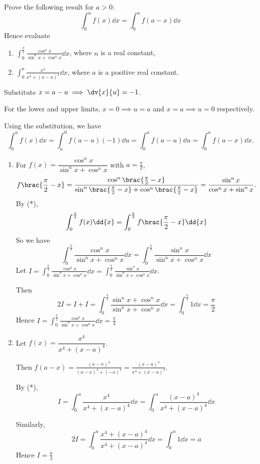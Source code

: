 \begin{exercise}{}{}
Prove the following result for $a>0$:
\begin{equation*}\tag{*}
\int_0^af(x)\dd{x}=\int_0^af(a-x)\dd{x}
\end{equation*}
Hence evaluate
\begin{enumerate}[label=(\alph*)]
\item $\displaystyle\int_0^\frac{\pi}{2}\frac{\cos^nx}{\sin^nx+\cos^nx}\dd{x}$, where $n$ is a real constant,
\item $\displaystyle\int_0^a\frac{x^4}{x^4+(x-a)^4}\dd{x}$, where $a$ is a positive real constant.
\end{enumerate}
\end{exercise}
\begin{solution}
Substitute $x=a-u\implies\dv{x}{u}=-1$.

For the lower and upper limits, $x=0\implies u=a$ and $x=a\implies u=0$ respectively.

Using the substitution, we have
\[ \int_0^af(x)\dd{x}=\int_a^0f(a-u)(-1)\dd{u}=\int_0^af(a-u)\dd{u}=\int_0^af(a-x)\dd{x}. \]

\begin{enumerate}[label=(\alph*)]
\item For $f(x)=\dfrac{\cos^nx}{\sin^nx+\cos^nx}$ with $a=\frac{\pi}{2}$,
\[ f\brac{\frac{\pi}{2}-x}=\frac{\cos^n\brac{\frac{\pi}{2}-x}}{\sin^n\brac{\frac{\pi}{2}-x}+\cos^n\brac{\frac{\pi}{2}-x}}=\frac{\sin^nx}{\cos^nx+\sin^nx}. \]
By (*), 
\[ \int_0^\frac{\pi}{2}f(x)\dd{x}=\int_0^\frac{\pi}{2}f\brac{\frac{\pi}{2}-x}\dd{x} \]
So we have
\[ \int_0^\frac{\pi}{2}\frac{\cos^nx}{\sin^nx+\cos^nx}\dd{x}=\int_0^\frac{\pi}{2}\frac{\sin^nx}{\sin^nx+\cos^nx}\dd{x} \]
Let $\displaystyle I=\int_0^\frac{\pi}{2}\frac{\cos^nx}{\sin^nx+\cos^nx}\dd{x}=\int_0^\frac{\pi}{2}\frac{\sin^nx}{\sin^nx+\cos^nx}\dd{x}$.

Then
\[ 2I=I+I=\int_0^\frac{\pi}{2}\frac{\sin^nx+\cos^nx}{\sin^nx+\cos^nx}\dd{x}=\int_0^\frac{\pi}{2}1\dd{x}=\frac{\pi}{2} \]
Hence $\displaystyle I=\int_0^\frac{\pi}{2}\frac{\cos^nx}{\sin^nx+\cos^nx}\dd{x}=\boxed{\frac{\pi}{4}}$

\item Let $f(x)=\dfrac{x^4}{x^4+(x-a)^4}$.

Then $f(a-x)=\frac{(a-x)^4}{(a-x)^4+(-x)^4}=\frac{(x-a)^4}{x^4+(x-a)^4}$.

By (*),
\[ I=\int_0^a\frac{x^4}{x^4+(x-a)^4}\dd{x}=\int_0^a\frac{(x-a)^4}{x^4+(x-a)^4}\dd{x} \]

Similarly, 
\[ 2I=\int_0^a\frac{x^4+(x-a)^4}{x^4+(x-a)^4}\dd{x}=\int_0^a1\dd{x}=a \]
Hence $I=\boxed{\frac{a}{2}}$
\end{enumerate}
\end{solution}

